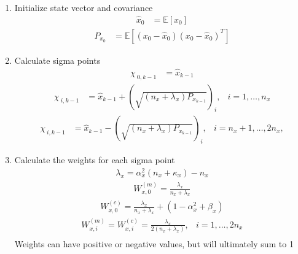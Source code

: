\begin{enumerate}
    \item Initialize state vector and covariance
    \begin{align*}
        \hat{x}_{0} &= \mathbb{E}[x_{0}] 
       \end{align*}
        \begin{align*}
        P_{x_{0}} &= \mathbb{E}[(x_{0}-\hat{x}_{0})(x_{0}-\hat{x}_{0})^{T}] 
    \end{align*}
    \item Calculate sigma points
    \begin{align*}
        \chi_{\ 0,k-1} &= \hat{x}_{k-1} 
     \end{align*}
     \begin{align*}
        \chi_{\ i,k-1} &= \hat{x}_{k-1} + (\sqrt{(n_{x}+\lambda_{x})P_{x_{k-1}}})_{i}, &  i=1,\dots,n_{x} 
        \end{align*}
        \begin{align*}
        \chi_{\ i,k-1} &= \hat{x}_{k-1} - (\sqrt{(n_{x}+\lambda_{x})P_{x_{k-1}}})_{i},  &  i=n_{x}+1,\dots,2n_{x},
    \end{align*}
    \item Calculate the weights for each sigma point 
    \begin{align*}
        \lambda_{x} = \alpha_{x}^{2}(n_{x}+\kappa_{x})-n_{x} 
         \end{align*}
        \begin{align*}
        W^{(m)}_{x,0} = \frac{\lambda_{x}}{n_{x}+ \lambda_{x} } 
         \end{align*}
        \begin{align*}
        W^{(c)}_{x,0} = \frac{\lambda_{x}}{n_{x}+ \lambda_{x} } + (1 - \alpha^{2}_{x} + \beta_{x}) 
         \end{align*}
        \begin{align*}
        W^{(m)}_{x,i} = W^{(c)}_{x,i} = \frac{\lambda_{x}}{2(n_{x}+ \lambda_{x}) }, & i=1,\dots,2n_{x} \\
            \end{align*}
    Weights can have positive or negative values, but will ultimately sum to 1 \cite{article6}
    

\end{enumerate}
